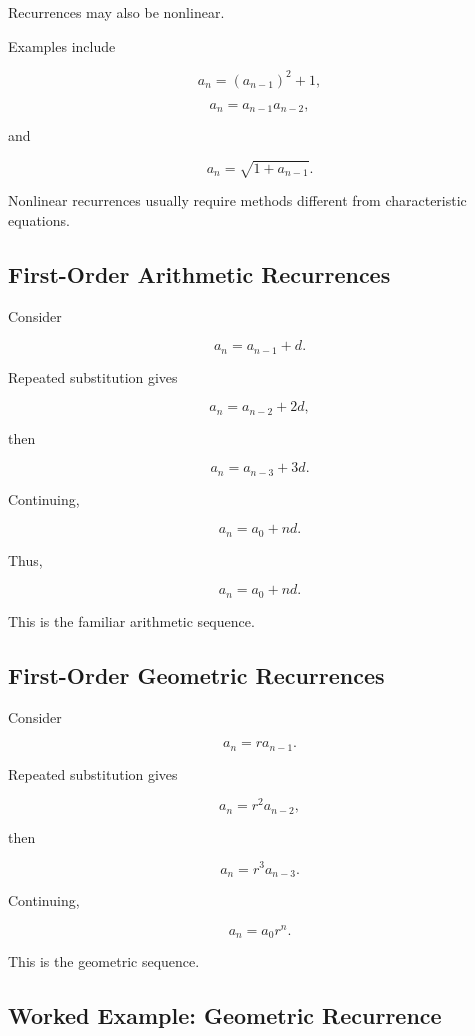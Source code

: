 Recurrences may also be nonlinear.

Examples include

\[
a_n=(a_{n-1})^2+1,
\]

\[
a_n=a_{n-1}a_{n-2},
\]

and

\[
a_n=\sqrt{1+a_{n-1}}.
\]

Nonlinear recurrences usually require methods different from
characteristic equations.

\subsection{First-Order Arithmetic Recurrences}
\label{subsec:first-order-arithmetic}

Consider

\[
a_n=a_{n-1}+d.
\]

Repeated substitution gives

\[
a_n=a_{n-2}+2d,
\]

then

\[
a_n=a_{n-3}+3d.
\]

Continuing,

\[
a_n=a_0+nd.
\]

Thus,

\[
\boxed{
a_n=a_0+nd.
}
\]

This is the familiar arithmetic sequence.

\subsection{First-Order Geometric Recurrences}
\label{subsec:first-order-geometric}

Consider

\[
a_n=ra_{n-1}.
\]

Repeated substitution gives

\[
a_n=r^2a_{n-2},
\]

then

\[
a_n=r^3a_{n-3}.
\]

Continuing,

\[
\boxed{
a_n=a_0r^n.
}
\]

This is the geometric sequence.

\subsection{Worked Example: Geometric Recurrence}
\label{subsec:worked-geometric-recurrence}

